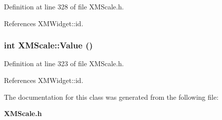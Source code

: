 Definition at line 328 of file XMScale.h.

References XMWidget::id.
\subsubsection{\setlength{\rightskip}{0pt plus 5cm}int XMScale::Value ()\hspace{0.3cm}{\tt  [inline]}}\label{classXMScale_a5}




Definition at line 323 of file XMScale.h.

References XMWidget::id.

The documentation for this class was generated from the following file:\begin{CompactItemize}
\item 
{\bf XMScale.h}\end{CompactItemize}
